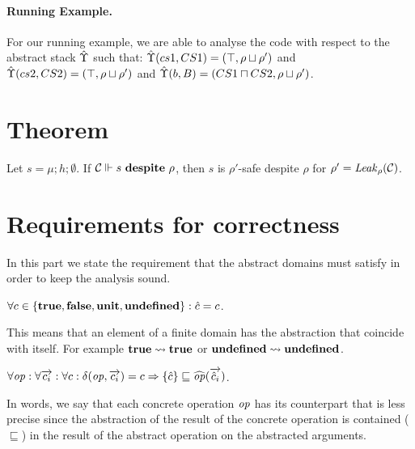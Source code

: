 \paragraph{Running Example.}
For our running example, we are able to analyse the code with respect
to the abstract stack $\hat{\Upsilon}$ such that: $\hat{\Upsilon}(cs1, CS1) =
(\top,\rho \sqcup \rho')$ and $\hat{\Upsilon}(cs2,CS2) = (\top,\rho \sqcup
\rho')$ and $\hat{\Upsilon}(b,B) = (CS1 \sqcap CS2,\rho \sqcup \rho')$. 

\section{Theorem}
\label{sec:Theorem}
\begin{theorem}
\label{thm:safety-compromise}
Let $s = \mu;h;\emptyset$. If ${\cal C} \Vdash s \ \mathbf{despite}\ \rho$, then $s$ is $\rho'$-safe despite $\rho$ for $\rho' = \mathit{Leak}_{\rho}({\cal C})$. 
\end{theorem}

\section{Requirements for correctness}
\label{sec:CorrectnesReqs}
In this part we state the requirement that the abstract domains must satisfy in order to keep the analysis sound.

\begin{assumption}
\label{asm:finite}
$\forall c \in \{\mathbf{true},\mathbf{false},\mathbf{unit},\mathbf{undefined}\}: \hat{c} = c$.
\end{assumption}
This means that an element of a finite domain has the abstraction that coincide with itself. For example $\mathbf{true} \rightsquigarrow \mathbf{true}$ or $\mathbf{undefined} \rightsquigarrow \mathbf{undefined}$.

\begin{assumption}
\label{asm:sound-abs-op}
$\forall \mathit{op}: \forall \overrightarrow{c_i}: \forall c: \delta(\mathit{op},\overrightarrow{c_i}) = c \Rightarrow \{\hat{c}\} \sqsubseteq \widehat{\mathit{op}}(\overrightarrow{{\hat{c}_i}})$.
\end{assumption}
In words, we say that each concrete operation $\mathit{op}$ has its counterpart that is less precise since the abstraction of the result of the concrete operation is contained ($\sqsubseteq$) in the result of the abstract operation on the abstracted arguments.

